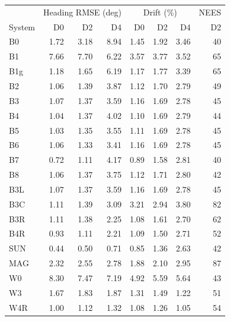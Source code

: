 \begin{tabular}{lrrrrrrr}
\toprule
 & \multicolumn{3}{c}{Heading RMSE (deg)} & \multicolumn{3}{c}{Drift (\%)} & NEES \\
System & D0 & D2 & D4 & D0 & D2 & D4 & D2 \\
\midrule
B0 & 1.72 & 3.18 & 8.94 & 1.45 & 1.92 & 3.46 & 40 \\
B1 & 7.66 & 7.70 & 6.22 & 3.57 & 3.77 & 3.52 & 65 \\
B1g & 1.18 & 1.65 & 6.19 & 1.17 & 1.77 & 3.39 & 65 \\
B2 & 1.06 & 1.39 & 3.87 & 1.12 & 1.70 & 2.79 & 49 \\
B3 & 1.07 & 1.37 & 3.59 & 1.16 & 1.69 & 2.78 & 45 \\
B4 & 1.04 & 1.37 & 4.02 & 1.10 & 1.69 & 2.79 & 44 \\
B5 & 1.03 & 1.35 & 3.55 & 1.11 & 1.69 & 2.78 & 45 \\
B6 & 1.06 & 1.33 & 3.41 & 1.16 & 1.69 & 2.78 & 45 \\
B7 & 0.72 & 1.11 & 4.17 & 0.89 & 1.58 & 2.81 & 40 \\
B8 & 1.06 & 1.37 & 3.75 & 1.12 & 1.71 & 2.80 & 42 \\
B3L & 1.07 & 1.37 & 3.59 & 1.16 & 1.69 & 2.78 & 45 \\
B3C & 1.11 & 1.39 & 3.09 & 3.21 & 2.94 & 3.80 & 82 \\
B3R & 1.11 & 1.38 & 2.25 & 1.08 & 1.61 & 2.70 & 62 \\
B4R & 0.93 & 1.11 & 2.21 & 1.09 & 1.50 & 2.71 & 52 \\
SUN & 0.44 & 0.50 & 0.71 & 0.85 & 1.36 & 2.63 & 42 \\
MAG & 2.32 & 2.55 & 2.78 & 1.88 & 2.10 & 2.95 & 87 \\
W0 & 8.30 & 7.47 & 7.19 & 4.92 & 5.59 & 5.64 & 43 \\
W3 & 1.67 & 1.83 & 1.87 & 1.31 & 1.49 & 1.22 & 51 \\
W4R & 1.00 & 1.12 & 1.32 & 1.08 & 1.26 & 1.05 & 54 \\
\bottomrule
\end{tabular}